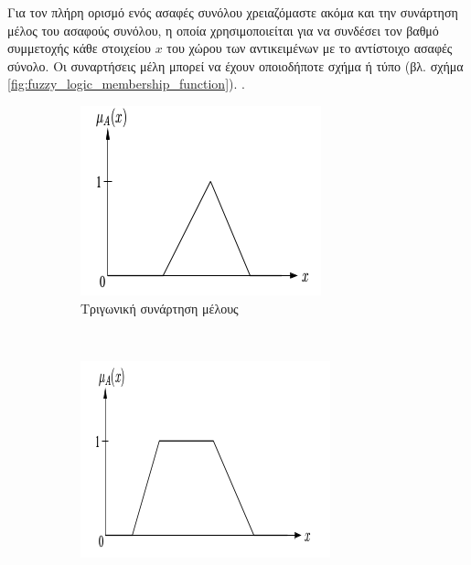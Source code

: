 \documentclass{assignment}
\begin{document}
Για τον πλήρη ορισμό ενός ασαφές συνόλου χρειαζόμαστε ακόμα και την συνάρτηση μέλος του ασαφούς συνόλου, η οποία χρησιμοποιείται για να συνδέσει τον βαθμό συμμετοχής κάθε στοιχείου $x$ του χώρου των αντικειμένων με το αντίστοιχο ασαφές σύνολο. Οι συναρτήσεις μέλη μπορεί να έχουν οποιοδήποτε σχήμα ή τύπο (βλ. σχήμα \ref{fig:fuzzy_logic_membership_function}). \cite{engelbrecht}.

\begin{figure}[htbp]
  \centering
  \begin{subfigure}[b]{0.5\textwidth}
     \includegraphics[width=\textwidth,height=0.25\textheight]{images/fuzzy_logic_membership_function_triangular.png}
  \caption{Τριγωνική συνάρτηση μέλους}
  \end{subfigure}%
   ~ %
  \begin{subfigure}[b]{0.5\textwidth}
    \includegraphics[width=\textwidth,height=0.25\textheight]{images/fuzzy_logic_membership_function_trapezoidal.png}

\end{subfigure}
\end{figure}
\end{document}
